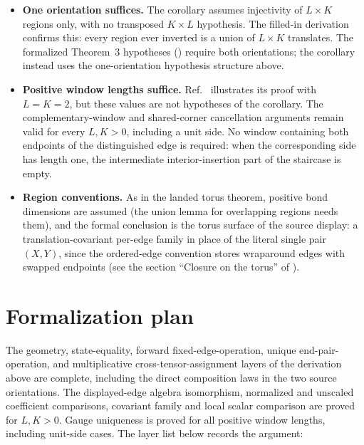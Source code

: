\documentclass{article}
\begin{document}
\begin{itemize}
    \item \textbf{One orientation suffices.} The corollary assumes
          injectivity of $L \times K$ regions only, with no transposed
          $K \times L$ hypothesis. The filled-in derivation confirms this:
          every region ever inverted is a union of $L \times K$ translates.
          The formalized Theorem~3 hypotheses
          ()
          require both orientations; the corollary instead uses the
          one-orientation hypothesis structure above.
    \item \textbf{Positive window lengths suffice.}
          Ref.~\cite{Molnar2018NormalPEPS} illustrates its proof with
          $L=K=2$, but these values are not hypotheses of the corollary.
          The complementary-window and shared-corner cancellation arguments
          remain valid for every $L,K>0$, including a unit side. No window
          containing both endpoints of the distinguished edge is required:
          when the corresponding side has length one, the intermediate
          interior-insertion part of the staircase is empty.
    \item \textbf{Region conventions.} As in the landed torus theorem,
          positive bond dimensions are assumed (the union lemma for
          overlapping regions needs them), and the formal conclusion is the
          torus surface of the source display: a translation-covariant
          per-edge family in place of the literal single pair $(X, Y)$, since
          the ordered-edge convention stores wraparound edges with swapped
          endpoints (see the section ``Closure on the torus'' of
          ).
\end{itemize}

\section{Formalization plan}

The geometry, state-equality, forward fixed-edge-operation, unique
end-pair-operation, and multiplicative cross-tensor-assignment layers of the
derivation above are complete, including the direct composition laws in the
two source orientations. The displayed-edge algebra isomorphism,
normalized and unscaled coefficient comparisons, covariant family and
local scalar comparison are proved for $L,K>0$. Gauge uniqueness is
proved for all positive window lengths, including unit-side cases. The layer list below records the argument:
\end{document}
